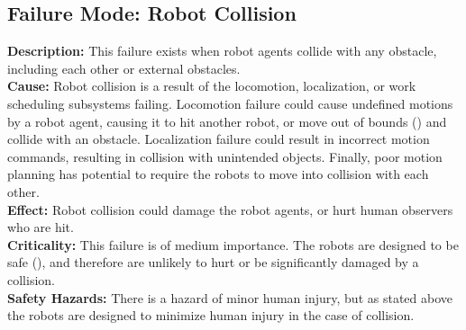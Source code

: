 \subsection{Failure Mode: Robot Collision}
\label{sec:sys_val_fm_collision}
\textbf{Description:} This failure exists when robot agents collide with any obstacle, including each other or external obstacles.\\
\textbf{Cause:} Robot collision is a result of the locomotion, localization, or work scheduling subsystems failing. Locomotion failure could cause undefined motions by a robot agent, causing it to hit another robot, or move out of bounds () and collide with an obstacle. Localization failure could result in incorrect motion commands, resulting in collision with unintended objects. Finally, poor motion planning has potential to require the robots to move into collision with each other.\\
\textbf{Effect:} Robot collision could damage the robot agents, or hurt human observers who are hit.\\
\textbf{Criticality:} This failure is of medium importance. The robots are designed to be safe (), and therefore are unlikely to hurt or be significantly damaged by a collision. \\
\textbf{Safety Hazards:} There is a hazard of minor human injury, but as stated above the robots are designed to minimize human injury in the case of collision.\\

